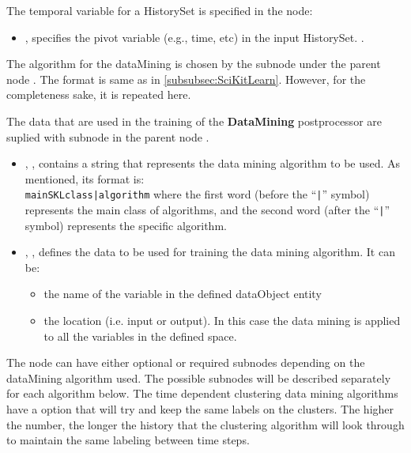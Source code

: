 The temporal variable for a HistorySet  is specified in the  node:
\begin{itemize}
  \item {},  specifies the pivot variable (e.g., time, etc) in the input HistorySet.
      .
\end{itemize}

The algorithm for the dataMining is chosen by the subnode  under the parent node
. The format is same as in \ref{subsubsec:SciKitLearn}. However, for the completeness
sake, it is repeated here.

The data that are used in the training of the \textbf{DataMining}
postprocessor are suplied with subnode  in the parent node
 .


\begin{itemize}
  \item {}, , contains a string that represents the data mining algorithm
  to be used.
  As mentioned, its format is:\\
  \texttt{mainSKLclass|algorithm} where the
  first word (before the ``\texttt{|}'' symbol) represents the main class of
  algorithms, and the second word (after the ``\texttt{|}'' symbol) represents
  the specific algorithm.
  \item {}, , defines the data
  to be used for training the data mining algorithm. It can be:
  \begin{itemize}
	\item the name of the variable in the defined dataObject entity
	\item the location (i.e. input or output). In this case the data mining
        is applied to all the variables in the defined space.
  \end{itemize}
\end{itemize}

The  node can have either optional or required subnodes depending
 on the dataMining algorithm used. The possible subnodes will be described separately
 for each algorithm below. The time dependent clustering data mining algorithms have a  option that will try and keep the same labels on the clusters.  The higher the number, the longer the history that the clustering algorithm will look through to maintain the same labeling between time steps.

